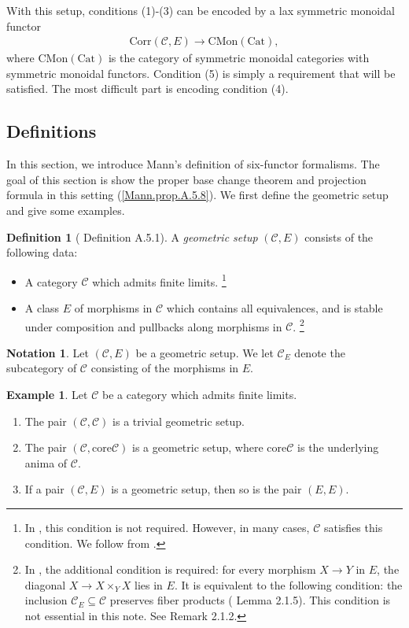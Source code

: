 \documentclass[a4paper,dvipdfmx,11pt,reqno]{amsart}
\newcommand{\C}{\mathcal{C}}
\newcommand{\Cat}{\mathrm{Cat}}
\newcommand{\CMon}{\mathrm{CMon}}
\newcommand{\Corr}{\mathrm{Corr}}
\newcommand{\core}{\mathrm{core}}
\theoremstyle{definition}
\newtheorem{definition}[theorem]{Definition}
\newtheorem{example}[theorem]{Example}
\newtheorem{notation}[theorem]{Notation}
\begin{document}
With this setup, conditions (1)-(3) can be encoded by a lax symmetric monoidal functor 
\begin{align*}
  \Corr(\C,E) \to \CMon(\Cat),
\end{align*}
where $\CMon(\Cat)$ is the category of symmetric monoidal categories with symmetric monoidal functors.
Condition (5) is simply a requirement that will be satisfied.
The most difficult part is encoding condition (4).

\subsection{Definitions} \label{subsec.six_functors_formalisms}

In this section, we introduce Mann's definition of six-functor formalisms.
The goal of this section is show the proper base change theorem and projection formula in this setting (\cref{Mann.prop.A.5.8}). 
We first define the geometric setup and give some examples.

\begin{definition}[\cite{Mann22} Definition A.5.1] \label{Mann.def.A.5.1}
  A \textit{geometric setup} $(\C,E)$ consists of the following data:
  \begin{itemize}
    \item A category $\C$ which admits finite limits.
    \footnote{
      In \cite{Mann22}, this condition is not required. 
      However, in many cases, $\C$ satisfies this condition.
      We follow from \cite{Sch22}.
    }
    \item A class $E$ of morphisms in $\C$ which contains all equivalences, and is stable under composition and pullbacks along morphisms in $\C$.
    \footnote{
      In \cite{HM24}, the additional condition is required: 
      for every morphism $X \to Y$ in $E$, the diagonal $X \to X \times_{Y} X$ lies in $E$.
      It is equivalent to the following condition:
      the inclusion $\C_{E} \subseteq \C$ preserves fiber products (\cite{HM24} Lemma 2.1.5).
      This condition is not essential in this note. 
      See \cite{HM24} Remark 2.1.2.
    }
  \end{itemize}
\end{definition}

\begin{notation}
  Let $(\C,E)$ be a geometric setup.
  We let $\C_{E}$ denote the subcategory of $\C$ consisting of the morphisms in $E$.
\end{notation}

\begin{example}
  Let $\C$ be a category which admits finite limits.
  \begin{enumerate}
    \item The pair $(\C,\C)$ is a trivial geometric setup.
    \item The pair $(\C,\core\C)$ is a geometric setup, where $\core\C$ is the underlying anima of $\C$.
    \item If a pair $(\C,E)$ is a geometric setup, then so is the pair $(E,E)$. 
  \end{enumerate}
\end{example}
\end{document}
